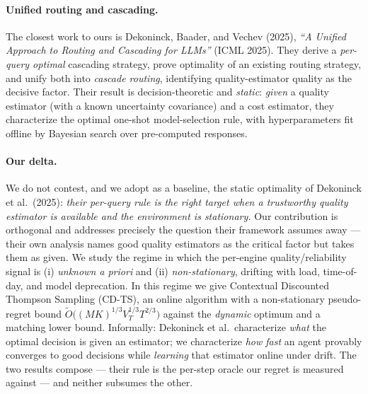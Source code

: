 \documentclass[11pt]{article}
\begin{document}
\paragraph{Unified routing and cascading.}
The closest work to ours is Dekoninck, Baader, and Vechev (2025), \emph{``A
Unified Approach to Routing and Cascading for LLMs''} (ICML 2025). They derive
a \emph{per-query optimal} cascading strategy, prove optimality of an existing
routing strategy, and unify both into \emph{cascade routing}, identifying
quality-estimator quality as the decisive factor. Their result is
decision-theoretic and \emph{static}: \emph{given} a quality estimator (with a
known uncertainty covariance) and a cost estimator, they characterize the
optimal one-shot model-selection rule, with hyperparameters fit offline by
Bayesian search over pre-computed responses.

\paragraph{Our delta.}
We do not contest, and we adopt as a baseline, the static optimality of
Dekoninck et al.\ (2025): \emph{their per-query rule is the right target when a
trustworthy quality estimator is available and the environment is stationary.}
Our contribution is orthogonal and addresses precisely the question their
framework assumes away --- their own analysis names good quality estimators as
the critical factor but takes them as given. We study the regime in which the
per-engine quality/reliability signal is (i) \emph{unknown a priori} and (ii)
\emph{non-stationary}, drifting with load, time-of-day, and model deprecation.
In this regime we give Contextual Discounted Thompson Sampling (CD-TS), an
online algorithm with a non-stationary pseudo-regret bound
$\widetilde{O}\big((MK)^{1/3} V_T^{1/3} T^{2/3}\big)$ against the \emph{dynamic}
optimum and a matching lower bound. Informally: Dekoninck et al.\ characterize
\emph{what} the optimal decision is given an estimator; we characterize \emph{how
fast} an agent provably converges to good decisions while \emph{learning} that
estimator online under drift. The two results compose --- their rule is the
per-step oracle our regret is measured against --- and neither subsumes the
other.
\end{document}
